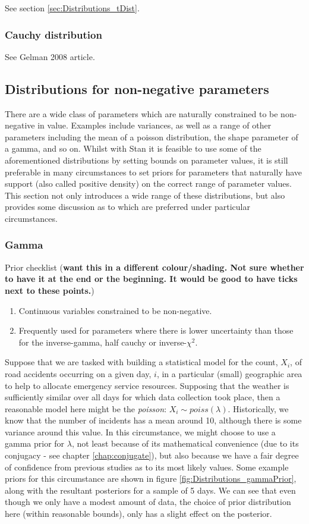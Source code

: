\documentclass[11pt,fullpage]{book}
\begin{document}
See section \ref{sec:Distributions_tDist}.

\subsubsection{Cauchy distribution}
See Gelman 2008 article.

\subsection{Distributions for non-negative parameters}
There are a wide class of parameters which are naturally constrained to be non-negative in value. Examples include variances, as well as a range of other parameters including the mean of a poisson distribution, the shape parameter of a gamma, and so on. Whilst with Stan it is feasible to use some of the aforementioned distributions by setting bounds on parameter values, it is still preferable in many circumstances to set priors for parameters that naturally have support (also called positive density) on the correct range of parameter values. This section not only introduces a wide range of these distributions, but also provides some discussion as to which are preferred under particular circumstances.

\subsubsection{Gamma}\label{sec:Distributions_gamma}
Prior checklist (\textbf{want this in a different colour/shading. Not sure whether to have it at the end or the beginning. It would be good to have ticks next to these points.})

\begin{enumerate} 
\item Continuous variables constrained to be non-negative.
\item Frequently used for parameters where there is lower uncertainty than those for the inverse-gamma, half cauchy or inverse-$\chi^2$.
\end{enumerate}

Suppose that we are tasked with building a statistical model for the count, $X_i$, of road accidents occurring on a given day, $i$, in a particular (small) geographic area to help to allocate emergency service resources. Supposing that the weather is sufficiently similar over all days for which data collection took place, then a reasonable model here might be the \textit{poisson}: $X_i\sim poiss(\lambda)$. Historically, we know that the number of incidents has a mean around 10, although there is some variance around this value. In this circumstance, we might choose to use a gamma prior for $\lambda$, not least because of its mathematical convenience (due to its conjugacy - see chapter \ref{chap:conjugate}), but also because we have a fair degree of confidence from previous studies as to its most likely values. Some example priors for this circumstance are shown in figure \ref{fig:Distributions_gammaPrior}, along with the resultant posteriors for a sample of 5 days. We can see that even though we only have a modest amount of data, the choice of prior distribution here (within reasonable bounds), only has a slight effect on the posterior.
\end{document}
